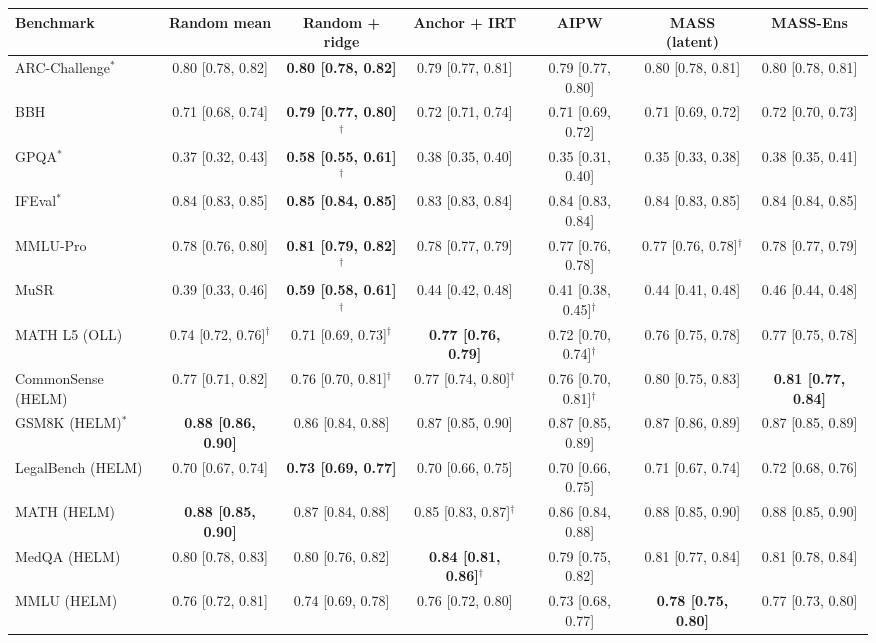 \begin{tabular}{lcccccc}
\toprule
Benchmark & Random mean & Random + ridge & Anchor + IRT & AIPW & MASS (latent) & MASS-Ens \\
\midrule
ARC-Challenge$^*$ & 0.80 [0.78, 0.82] & \textbf{0.80 [0.78, 0.82]} & 0.79 [0.77, 0.81] & 0.79 [0.77, 0.80] & 0.80 [0.78, 0.81] & 0.80 [0.78, 0.81] \\
BBH & 0.71 [0.68, 0.74] & \textbf{0.79 [0.77, 0.80]$^\dagger$} & 0.72 [0.71, 0.74] & 0.71 [0.69, 0.72] & 0.71 [0.69, 0.72] & 0.72 [0.70, 0.73] \\
GPQA$^*$ & 0.37 [0.32, 0.43] & \textbf{0.58 [0.55, 0.61]$^\dagger$} & 0.38 [0.35, 0.40] & 0.35 [0.31, 0.40] & 0.35 [0.33, 0.38] & 0.38 [0.35, 0.41] \\
IFEval$^*$ & 0.84 [0.83, 0.85] & \textbf{0.85 [0.84, 0.85]} & 0.83 [0.83, 0.84] & 0.84 [0.83, 0.84] & 0.84 [0.83, 0.85] & 0.84 [0.84, 0.85] \\
MMLU-Pro & 0.78 [0.76, 0.80] & \textbf{0.81 [0.79, 0.82]$^\dagger$} & 0.78 [0.77, 0.79] & 0.77 [0.76, 0.78] & 0.77 [0.76, 0.78]$^\dagger$ & 0.78 [0.77, 0.79] \\
MuSR & 0.39 [0.33, 0.46] & \textbf{0.59 [0.58, 0.61]$^\dagger$} & 0.44 [0.42, 0.48] & 0.41 [0.38, 0.45]$^\dagger$ & 0.44 [0.41, 0.48] & 0.46 [0.44, 0.48] \\
MATH L5 (OLL) & 0.74 [0.72, 0.76]$^\dagger$ & 0.71 [0.69, 0.73]$^\dagger$ & \textbf{0.77 [0.76, 0.79]} & 0.72 [0.70, 0.74]$^\dagger$ & 0.76 [0.75, 0.78] & 0.77 [0.75, 0.78] \\
CommonSense (HELM) & 0.77 [0.71, 0.82] & 0.76 [0.70, 0.81]$^\dagger$ & 0.77 [0.74, 0.80]$^\dagger$ & 0.76 [0.70, 0.81]$^\dagger$ & 0.80 [0.75, 0.83] & \textbf{0.81 [0.77, 0.84]} \\
GSM8K (HELM)$^*$ & \textbf{0.88 [0.86, 0.90]} & 0.86 [0.84, 0.88] & 0.87 [0.85, 0.90] & 0.87 [0.85, 0.89] & 0.87 [0.86, 0.89] & 0.87 [0.85, 0.89] \\
LegalBench (HELM) & 0.70 [0.67, 0.74] & \textbf{0.73 [0.69, 0.77]} & 0.70 [0.66, 0.75] & 0.70 [0.66, 0.75] & 0.71 [0.67, 0.74] & 0.72 [0.68, 0.76] \\
MATH (HELM) & \textbf{0.88 [0.85, 0.90]} & 0.87 [0.84, 0.88] & 0.85 [0.83, 0.87]$^\dagger$ & 0.86 [0.84, 0.88] & 0.88 [0.85, 0.90] & 0.88 [0.85, 0.90] \\
MedQA (HELM) & 0.80 [0.78, 0.83] & 0.80 [0.76, 0.82] & \textbf{0.84 [0.81, 0.86]$^\dagger$} & 0.79 [0.75, 0.82] & 0.81 [0.77, 0.84] & 0.81 [0.78, 0.84] \\
MMLU (HELM) & 0.76 [0.72, 0.81] & 0.74 [0.69, 0.78] & 0.76 [0.72, 0.80] & 0.73 [0.68, 0.77] & \textbf{0.78 [0.75, 0.80]} & 0.77 [0.73, 0.80] \\
\bottomrule
\end{tabular}
